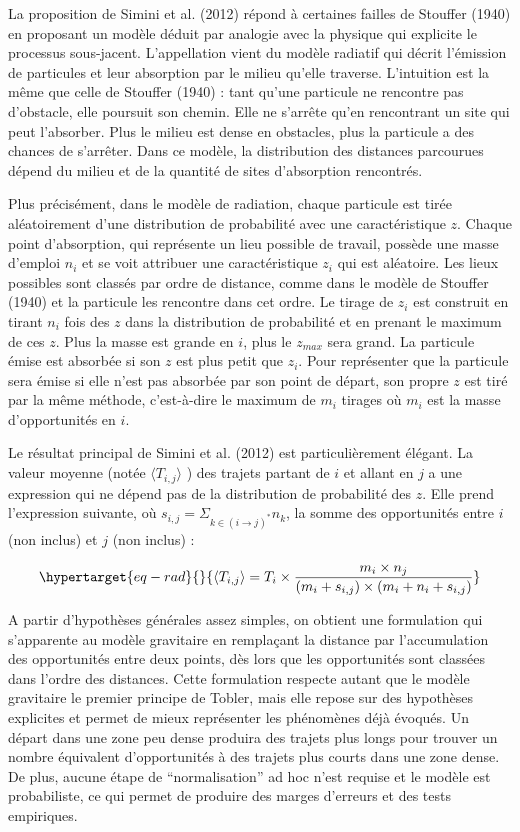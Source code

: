 \documentclass[
  10pt,
  a4paper,
  numbers=noendperiod,
  DIV=12]{scrartcl}
\begin{document}
La proposition de Simini et al. (2012) répond à certaines failles de
Stouffer (1940) en proposant un modèle déduit par analogie avec la
physique qui explicite le processus sous-jacent. L'appellation vient du
modèle radiatif qui décrit l'émission de particules et leur absorption
par le milieu qu'elle traverse. L'intuition est la même que celle de
Stouffer (1940) : tant qu'une particule ne rencontre pas d'obstacle,
elle poursuit son chemin. Elle ne s'arrête qu'en rencontrant un site qui
peut l'absorber. Plus le milieu est dense en obstacles, plus la
particule a des chances de s'arrêter. Dans ce modèle, la distribution
des distances parcourues dépend du milieu et de la quantité de sites
d'absorption rencontrés.

Plus précisément, dans le modèle de radiation, chaque particule est
tirée aléatoirement d'une distribution de probabilité avec une
caractéristique \(z\). Chaque point d'absorption, qui représente un lieu
possible de travail, possède une masse d'emploi \(n_i\) et se voit
attribuer une caractéristique \(z_i\) qui est aléatoire. Les lieux
possibles sont classés par ordre de distance, comme dans le modèle de
Stouffer (1940) et la particule les rencontre dans cet ordre. Le tirage
de \(z_i\) est construit en tirant \(n_i\) fois des \(z\) dans la
distribution de probabilité et en prenant le maximum de ces \(z\). Plus
la masse est grande en \(i\), plus le \(z_{max}\) sera grand. La
particule émise est absorbée si son \(z\) est plus petit que \(z_i\).
Pour représenter que la particule sera émise si elle n'est pas absorbée
par son point de départ, son propre \(z\) est tiré par la même méthode,
c'est-à-dire le maximum de \(m_i\) tirages où \(m_i\) est la masse
d'opportunités en \(i\).

Le résultat principal de Simini et al. (2012) est particulièrement
élégant. La valeur moyenne (notée \(\langle T_{i,j}\rangle\) ) des
trajets partant de \(i\) et allant en \(j\) a une expression qui ne
dépend pas de la distribution de probabilité des \(z\). Elle prend
l'expression suivante, où
\(s_{i,j}=\Sigma_{k \in (i \rightarrow j)^*} n_k\), la somme des
opportunités entre \(i\) (non inclus) et \(j\) (non inclus) :

\begin{equation}\protect\hypertarget{eq-rad}{}{
\langle T_{i,j}\rangle = T_i \times \frac {m_i \times n_j}{(m_i + s_{i,j}) \times (m_i + n_i +s_{i,j})}
}\label{eq-rad}\end{equation}

A partir d'hypothèses générales assez simples, on obtient une
formulation qui s'apparente au modèle gravitaire en remplaçant la
distance par l'accumulation des opportunités entre deux points, dès lors
que les opportunités sont classées dans l'ordre des distances. Cette
formulation respecte autant que le modèle gravitaire le premier principe
de Tobler, mais elle repose sur des hypothèses explicites et permet de
mieux représenter les phénomènes déjà évoqués. Un départ dans une zone
peu dense produira des trajets plus longs pour trouver un nombre
équivalent d'opportunités à des trajets plus courts dans une zone dense.
De plus, aucune étape de ``normalisation'' ad hoc n'est requise et le
modèle est probabiliste, ce qui permet de produire des marges d'erreurs
et des tests empiriques.
\end{document}

